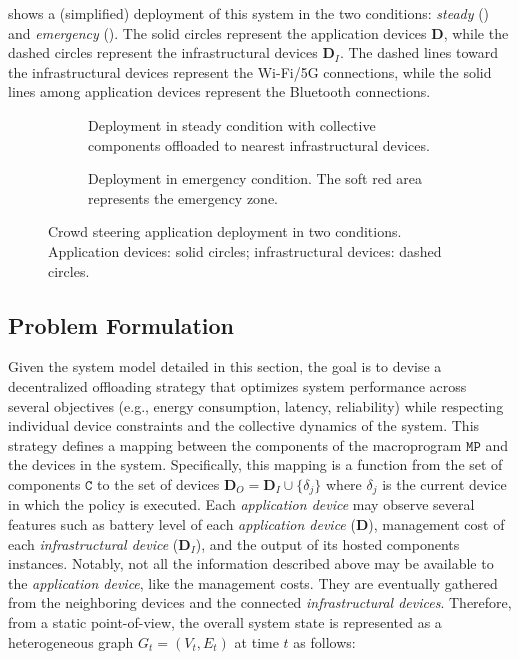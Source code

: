 shows a (simplified) deployment of this system in the two conditions:
 \emph{steady} () and \emph{emergency} ().
%
The solid circles represent the application devices $\mathbf{D}$,
 while the dashed circles represent the infrastructural devices $\mathbf{D}_I$.
%
The dashed lines toward the infrastructural devices represent the Wi-Fi/5G connections,
 while the solid lines among application devices represent the Bluetooth connections.

\begin{figure}
  \centering
  \begin{subfigure}[t]{0.45\textwidth}
    \centering
    \def\svgwidth{0.7\textwidth}\footnotesize
    
    \caption{Deployment in steady condition with collective components offloaded to nearest infrastructural devices.}
    \label{fig:deployment-steady}
  \end{subfigure}
  \hfill
  \begin{subfigure}[t]{0.45\textwidth}
      \centering
      \def\svgwidth{0.7\textwidth}\footnotesize
      
      \caption{Deployment in emergency condition. The soft red area represents the emergency zone.}
      \label{fig:deployment-emergency}
  \end{subfigure}
  \caption{\label{fig:deployment-model}
    Crowd steering application deployment in two conditions.
    Application devices: solid circles; infrastructural devices: dashed circles.}
  \label{fig:application-infrastructural-devices}
\end{figure}

\subsection{Problem Formulation}
Given the system model detailed in this section, 
 the goal is to devise a decentralized offloading strategy that optimizes system performance across several objectives (e.g., energy consumption, latency, reliability) while respecting individual device constraints and the collective dynamics of the system.
%
This strategy defines a mapping between the components of the macroprogram $\mathtt{MP}$ and the devices in the system.
%
Specifically,
 this mapping is a function from the set of components $\mathtt{C}$ to the set of devices $\mathbf{D}_O = \mathbf{D}_I \cup \{\delta_j\}$
 where $\delta_j$ is the current device in which the policy is executed.
%
Each \emph{application device} may observe several features such as 
 battery level of each \emph{application device} ($\mathbf{D}$),
 management cost of each \emph{infrastructural device} ($\mathbf{D}_I$),
 and the output of its hosted components instances.
%
Notably,
 not all the information described above may be available to the \emph{application device},
 like the management costs.
%
They are eventually gathered from the neighboring devices and the connected \emph{infrastructural devices}.
%
Therefore,
 from a static point-of-view,
 the overall system state is represented as a heterogeneous graph $G_t = (V_t, E_t)$ at time $t$ as follows:

